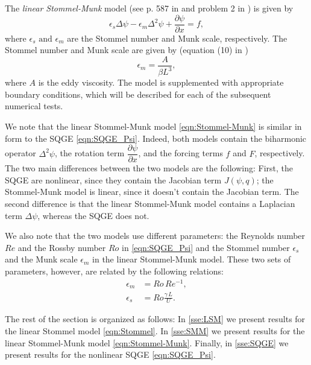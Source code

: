 The \emph{linear Stommel-Munk} model (see p. 587 in \cite{Vallis06} and problem
2 in \cite{Cascon}) is given by
\begin{equation}
  \epsilon_s \Delta \psi - \epsilon_m \Delta^2 \psi + \frac{\partial \psi}{\partial x} = f,
  \label{eqn:Stommel-Munk}
\end{equation}
where $\epsilon_s \text{ and } \epsilon_m$ are the Stommel number and Munk
scale, respectively. The Stommel number and Munk scale are given by (equation
(10) in \cite{Myers})
\begin{equation*}
  \epsilon_m = \frac{A}{\beta L^3},
\end{equation*}
where $A$ is the eddy viscosity.  The model is supplemented with appropriate
boundary conditions, which will be described for each of the subsequent
numerical tests.

We note that the linear Stommel-Munk model \eqref{eqn:Stommel-Munk} is similar
in form to the SQGE \eqref{eqn:SQGE_Psi}. Indeed, both models contain the
biharmonic operator $\Delta^2 \psi$, the rotation term $\dfrac{\partial
\psi}{\partial x}$, and the forcing terms $f$ and $F$, respectively. The two
main differences between the two models are the following: First, the SQGE are
nonlinear, since they contain the Jacobian term $J(\psi,q)$; the Stommel-Munk
model is linear, since it doesn't contain the Jacobian term. The second
difference is that the linear Stommel-Munk model contains a Laplacian term
$\Delta \psi$, whereas the SQGE does not.

We also note that the two models use different parameters: the Reynolds number
$Re$ and the Rossby number $Ro$ in \eqref{eqn:SQGE_Psi} and the Stommel number
$\epsilon_s$ and the Munk scale $\epsilon_m$ in the linear Stommel-Munk model.
These two sets of parameters, however, are related by the following relations:
\begin{align}
  \epsilon_m &= Ro\, Re^{-1}, \label{eqn:Munkscale}\\
  \epsilon_s &= Ro \frac{\gamma\, L}{U}. \label{eqn:Stommelnumber}
\end{align}

The rest of the section is organized as follows: In \autoref{sse:LSM} we
present results for the linear Stommel model \eqref{eqn:Stommel}. In
\autoref{sse:SMM} we present results for the linear Stommel-Munk model
\eqref{eqn:Stommel-Munk}. Finally, in \autoref{sse:SQGE} we present results for
the nonlinear SQGE \eqref{eqn:SQGE_Psi}.

